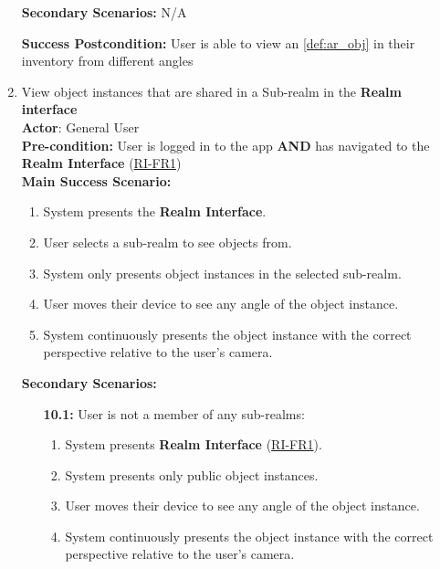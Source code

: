 \documentclass{article}
\begin{document}
\begin{enumerate}[label=\textbf{UC\arabic*}]
          \textbf{Secondary Scenarios:}
          N/A

          \textbf{Success Postcondition:} User is able to view an \ref{def:ar_obj} in their inventory from different angles


    \item \label{uc:10} View object instances that are shared in a Sub-realm in the \textbf{Realm interface} \\
          \textbf{Actor}: General User \\
          \textbf{Pre-condition:} User is logged in to the app \textbf{AND} has navigated to the \textbf{Realm Interface} (\hyperref[ssub:realm_interface]{RI-FR1}) \\

          \textbf{Main Success Scenario:}
          \begin{enumerate}[label=\textbf{\arabic*.}]
              \item System presents the \textbf{Realm Interface}.
              \item User selects a sub-realm to see objects from.
              \item System only presents object instances in the selected sub-realm.
              \item User moves their device to see any angle of the object instance.
              \item System continuously presents the object instance with the correct perspective relative to the user’s camera.
          \end{enumerate}

          \textbf{Secondary Scenarios:}
          \begin{itemize}
              \item[{\bf 10.1:}] User is not a member of any sub-realms:
                    \begin{enumerate}[label=\textbf{\arabic*.}]
                        \item System presents \textbf{Realm Interface} (\hyperref[ssub:realm_interface]{RI-FR1}).
                        \item System presents only public object instances.
                        \item User moves their device to see any angle of the object instance.
                        \item System continuously presents the object instance with the correct perspective relative to the user’s camera.
                    \end{enumerate}
          \end{itemize}


\end{enumerate}
\end{document}
